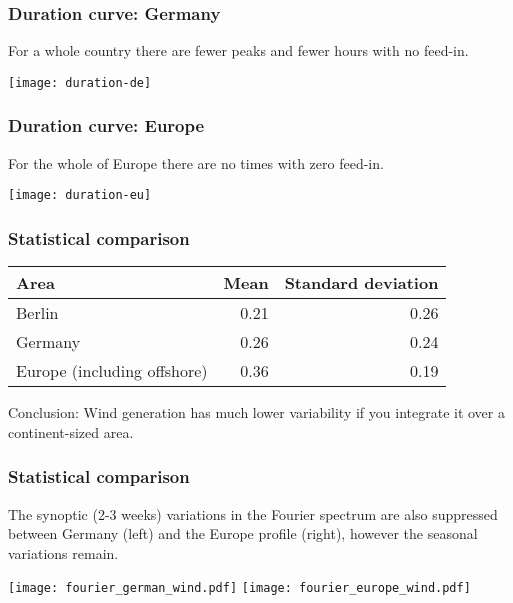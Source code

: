 \documentclass[10pt,aspectratio=169,dvipsnames]{beamer}
\newcommand{\ra}[1]{\renewcommand{\arraystretch}{#1}}
\begin{document}
\begin{frame}
  \frametitle{Duration curve: Germany}

  For a whole country there are fewer peaks and fewer hours with no feed-in.

  \centering
  \texttt{[image: duration-de]}


\end{frame}


\begin{frame}
  \frametitle{Duration curve: Europe}

  For the whole of Europe there are no times with zero feed-in.

  \centering
  \texttt{[image: duration-eu]}


\end{frame}





\begin{frame}
  \frametitle{Statistical comparison}


  \ra{1.1}
  \begin{table}[!t]
    \begin{tabular}{lrr}
      \toprule
      Area & Mean & Standard deviation\\
      \midrule
      Berlin & 0.21 & 0.26 \\
      Germany & 0.26 & 0.24 \\
      Europe (including offshore) & 0.36 & 0.19 \\
      \bottomrule
    \end{tabular}
  \end{table}

  \vspace{1cm}

  \alert{Conclusion}: Wind generation has much lower variability if you integrate it over a continent-sized area.
\end{frame}

\begin{frame}
  \frametitle{Statistical comparison}


  The \alert{synoptic} (2-3 weeks) variations in the Fourier spectrum are
  also suppressed between Germany (left) and the Europe
  profile (right), however the seasonal variations remain.

  \vspace{.7cm}
  \texttt{[image: fourier\_german\_wind.pdf]}
  \texttt{[image: fourier\_europe\_wind.pdf]}


\end{frame}
\end{document}
